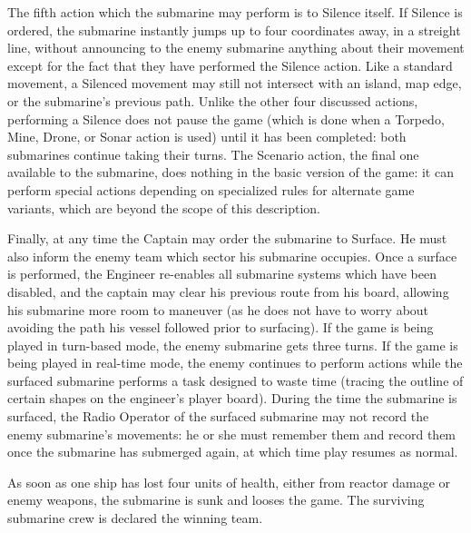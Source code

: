 The fifth action which the submarine may perform is to Silence itself. If Silence is ordered, the submarine instantly jumps up to four coordinates away, in a streight line, without announcing to the enemy submarine anything about their movement except for the fact that they have performed the Silence action. Like a standard movement, a Silenced movement may still not intersect with an island, map edge, or the submarine's previous path. Unlike the other four discussed actions, performing a Silence does not pause the game (which is done when a Torpedo, Mine, Drone, or Sonar action is used) until it has been completed: both submarines continue taking their turns. The Scenario action, the final one available to the submarine, does nothing in the basic version of the game: it can perform special actions depending on specialized rules for alternate game variants, which are beyond the scope of this description.


Finally, at any time the Captain may order the submarine to Surface. He must also inform the enemy team which sector his submarine occupies. Once a surface is performed, the Engineer re-enables all submarine systems which have been disabled, and the captain may clear his previous route from his board, allowing his submarine more room to maneuver (as he does not have to worry about avoiding the path his vessel followed prior to surfacing). If the game is being played in turn-based mode, the enemy submarine gets three turns. If the game is being played in real-time mode, the enemy continues to perform actions while the surfaced submarine performs a task designed to waste time (tracing the outline of certain shapes on the engineer's player board). During the time the submarine is surfaced, the Radio Operator of the surfaced submarine may not record the enemy submarine's movements: he or she must remember them and record them once the submarine has submerged again, at which time play resumes as normal.  

As soon as one ship has lost four units of health, either from reactor damage or enemy weapons, the submarine is sunk and looses the game. The surviving submarine crew is declared the winning team.







